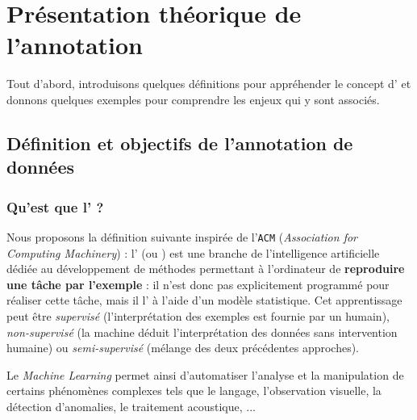 \section{Présentation théorique de l'annotation}
\label{section:2.1-PRESENTATION-ANNOTATION}

	Tout d'abord, introduisons quelques définitions pour appréhender le concept d' et donnons quelques exemples pour comprendre les enjeux qui y sont associés.
	
	
	\subsection{Définition et objectifs de l'annotation de données}
	\label{section:2.1.1-PRESENTATION-ANNOTATION-DEFINITION}
	
		\subsubsection{Qu'est que l' ?}
		\label{section:2.1.1.A-PRESENTATION-ANNOTATION-DEFINITION-MACHINE-LEARNING}
			
			Nous proposons la définition suivante inspirée de l'\texttt{ACM} (\textit{Association for Computing Machinery}) : l' (ou ) est une branche de l'intelligence artificielle dédiée au développement de méthodes permettant à l'ordinateur de \textbf{reproduire une tâche par l'exemple} : il n'est donc pas explicitement programmé pour réaliser cette tâche, mais il l' à l'aide d'un modèle statistique.
			Cet apprentissage peut être \textit{supervisé} (l'interprétation des exemples est fournie par un humain), \textit{non-supervisé} (la machine déduit l'interprétation des données sans intervention humaine) ou \textit{semi-supervisé} (mélange des deux précédentes approches).
			
			Le \textit{Machine Learning} permet ainsi d'automatiser l'analyse et la manipulation de certains phénomènes complexes tels que le langage, l'observation visuelle, la détection d'anomalies, le traitement acoustique, ...
			
